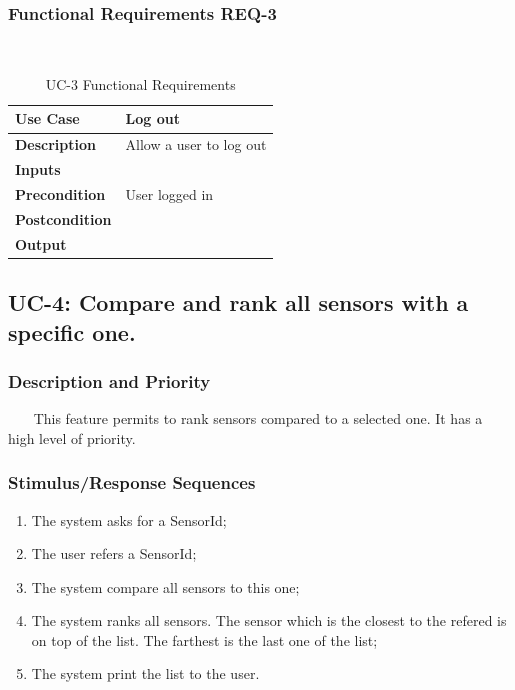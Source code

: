 \documentclass{report}
\begin{document}
\subsubsection*{Functional Requirements REQ-3} ~~~
\begin{table}[H]
	\begin{center}
		\begin{tabular}{|m{4cm}|m{10cm}|}
		\hline
		\textbf{Use Case} & Log out \\
		\hline
		\textbf{Description} & Allow a user to log out  \\
		\hline
		\textbf{Inputs} &  \\
		\hline
		\textbf{Precondition} & User logged in  \\
		\hline
		\textbf{Postcondition} &  \\
		\hline
		\textbf{Output} &  \\
		\hline
		\end{tabular}
	\end{center}
	\caption{UC-3 Functional Requirements}
	\label{table:REQ-3}
\end{table}

\subsection{UC-4: Compare and rank all sensors with a specific one.}

\subsubsection*{Description and Priority} ~~~
This feature permits to rank sensors compared to a selected one. It has a high
level of priority.

\subsubsection*{Stimulus/Response Sequences}
\begin{enumerate}
	\item The system asks for a SensorId;
	\item The user refers a SensorId;
	\item The system compare all sensors to this one;
	\item The system ranks all sensors. The sensor which is the closest to the
	refered is on top of the list. The farthest is the last one of the list;
	\item The system print the list to the user.
\end{enumerate}
\end{document}
